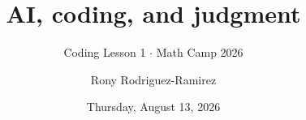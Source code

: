\title[API 209 \(\cdot\) MATH CAMP 2026 \(\cdot\) LESSON 1]{AI, coding, and judgment}
\subtitle{Coding Lesson 1 \(\cdot\) Math Camp 2026}
\author{Rony Rodriguez-Ramirez}
\date{Thursday, August 13, 2026}
